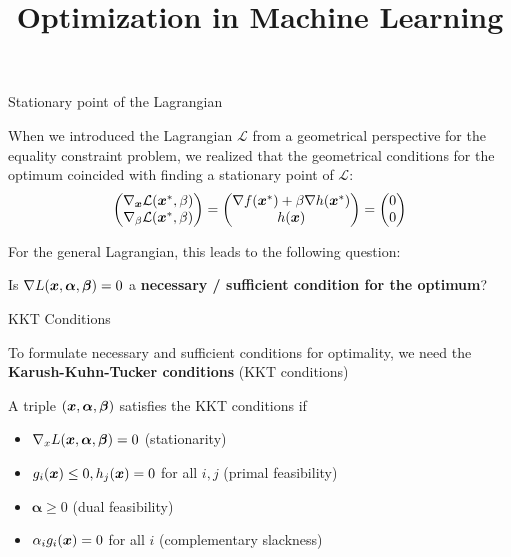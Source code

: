 \documentclass[11pt,compress,t,notes=noshow, xcolor=table]{beamer}
\title{Optimization in Machine Learning}
\begin{document}

\begin{framei}{Stationary point of the Lagrangian}
\item When we introduced the Lagrangian $\mathcal{L}$ from a geometrical perspective for the equality constraint problem, we realized that the geometrical conditions for the optimum coincided with finding a stationary point of $\mathcal{L}$: 
$$
\begin{pmatrix}
\nabla_{\bm{x}} \mathcal{L}(\bm{x}^\ast, \beta) \\
\nabla_{\beta} \mathcal{L}(\bm{x}^\ast, \beta)
\end{pmatrix} = \begin{pmatrix} \nabla f(\bm{x}^\ast) + \beta \nabla h(\bm{x}^\ast) \\
h(\bm{x})
\end{pmatrix} = \begin{pmatrix}
0 \\ 0 \end{pmatrix}
$$
\item For the general Lagrangian, this leads to the following question:\\
\spacer
\item[] Is $\nabla L(\bm{x}, \bm{\alpha}, \bm{\beta}) = 0$ a \textbf{necessary / sufficient condition for the optimum}?
\end{framei}


\begin{framei}[sep=L]{KKT Conditions}
\item To formulate necessary and sufficient conditions for optimality, we need the \textbf{Karush-Kuhn-Tucker conditions} (KKT conditions)
\item A triple $(\bm{x}, \bm{\alpha}, \bm{\beta})$ satisfies the KKT conditions if
\begin{itemize}
\item $\nabla_x L(\bm{x}, \bm{\alpha}, \bm{\beta}) = 0$ (stationarity)
\item $g_i(\bm{x}) \le 0, h_j(\bm{x}) = 0$ for all $i, j$ (primal feasibility)
\item $\bm{\alpha} \ge 0$ (dual feasibility)
\item $\alpha_i g_i(\bm{x}) = 0$ for all $i$ (complementary slackness)
\end{itemize}
\end{framei}
\end{document}
